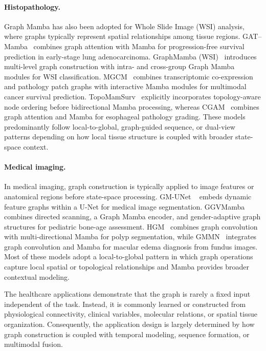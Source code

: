 \documentclass[acmsmall]{acmart}
\begin{document}
\paragraph{\textbf{Histopathology.}}
Graph Mamba has also been adopted for Whole Slide Image (WSI) analysis, where
graphs typically represent spatial relationships among tissue regions.
GAT--Mamba~\cite{ding2024combining} combines graph attention with Mamba for
progression-free survival prediction in early-stage lung adenocarcinoma.
GraphMamba (WSI)~\cite{zheng2025graphmamba} introduces multi-level graph construction
with intra- and cross-group Graph Mamba modules for WSI classification.
MGCM~\cite{cui2026mgcm} combines transcriptomic co-expression and pathology
patch graphs with interactive Mamba modules for multimodal cancer survival
prediction. TopoMamSurv~\cite{chen2026graph} explicitly incorporates
topology-aware node ordering before bidirectional Mamba processing, whereas
CGAM~\cite{qu2025cgam} combines graph attention and Mamba for esophageal
pathology grading. These models predominantly follow local-to-global,
graph-guided sequence, or dual-view patterns depending on how local
tissue structure is coupled with broader state-space context.


\paragraph{\textbf{Medical imaging.}}
In medical imaging, graph construction is typically applied to image features
or anatomical regions before state-space processing. GM-UNet
~\cite{zhang2024gm} embeds dynamic feature graphs within a U-Net for medical
image segmentation. GGVMamba~\cite{zhou2024efficient} combines directed
scanning, a Graph Mamba encoder, and gender-adaptive graph structures for
pediatric bone-age assessment. HGM~\cite{zhu2025hybrid} combines graph
convolution with multi-directional Mamba for polyp segmentation, while
GMMN~\cite{zhang2026graph} integrates graph convolution and Mamba for macular
edema diagnosis from fundus images. Most of these models adopt a
local-to-global pattern in which graph operations capture local spatial or
topological relationships and Mamba provides broader contextual modeling.

 



The healthcare applications demonstrate that the graph is rarely a fixed
input independent of the task. Instead, it is commonly learned or constructed
from physiological connectivity, clinical variables, molecular relations, or
spatial tissue organization. Consequently, the application design is largely
determined by how graph construction is coupled with temporal modeling,
sequence formation, or multimodal fusion.
\end{document}
